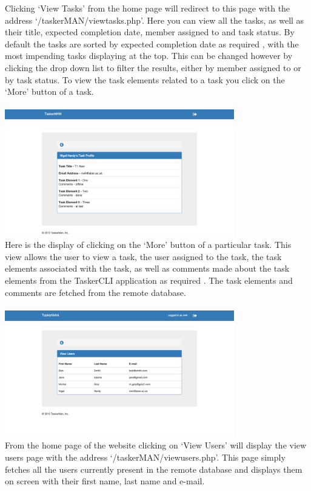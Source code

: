 \documentclass{project}
\begin{document}
Clicking `View Tasks' from the home page will redirect to this page with the address `/taskerMAN/viewtasks.php'. Here you can view all the tasks, as well as their title, expected completion date, member assigned to and task status. By default the tasks are sorted by expected completion date as required \cite{se.qa.rs}, with the most impending tasks displaying at the top. This can be changed however by clicking the drop down list to filter the results, either by member assigned to or by task status. To view the task elements related to a task you click on the `More' button of a task.  \\~\\
\newline
\includegraphics[width=0.75\textwidth, center]{images/5.2/TaskerMANViewTask2} \\
Here is the display of clicking on the `More' button of a particular task. This view allows the user to view a task, the user assigned to the task, the task elements associated with the task, as well as comments made about the task elements from the TaskerCLI application as required \cite{se.qa.rs}. The task elements and comments are fetched from the remote database. \\~\\
\newline
\includegraphics[width=0.75\textwidth, center]{images/5.2/TaskerMANViewUsers} \\
From the home page of the website clicking on `View Users' will display the view users page with the address `/taskerMAN/viewusers.php'. This page simply fetches all the users currently present in the remote database and displays them on screen with their first name, last name and e-mail. \\~\\
\newline
\clearpage
\end{document}
